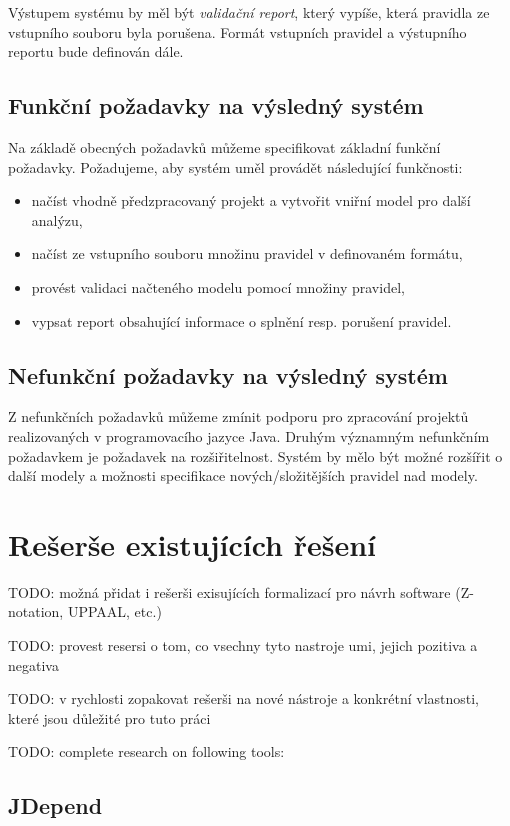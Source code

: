 Výstupem systému by měl být \emph{validační report}, který vypíše, která pravidla ze vstupního souboru byla porušena. Formát vstupních pravidel a výstupního reportu bude definován dále.

\subsection{Funkční požadavky na výsledný systém}

Na základě obecných požadavků můžeme specifikovat základní funkční požadavky. Požadujeme, aby systém uměl provádět následující funkčnosti:
\begin{itemize}
\item načíst vhodně předzpracovaný projekt a vytvořit vniřní model pro další analýzu,
\item načíst ze vstupního souboru množinu pravidel v definovaném formátu,
\item provést validaci načteného modelu pomocí množiny pravidel,
\item vypsat report obsahující informace o splnění resp. porušení pravidel.
\end{itemize}

\subsection{Nefunkční požadavky na výsledný systém}
Z nefunkčních požadavků můžeme zmínit podporu pro zpracování projektů realizovaných v programovacího jazyce Java. Druhým významným nefunkčním požadavkem je požadavek na rozšiřitelnost. Systém by mělo být možné rozšířit o další modely a možnosti specifikace nových/složitějších pravidel nad modely.

\section{Rešerše existujících řešení}
\label{requirements-existing_tools}

TODO: možná přidat i rešerši exisujících formalizací pro návrh software (Z-notation, UPPAAL, etc.)

TODO: provest resersi o tom, co vsechny tyto nastroje umi, jejich pozitiva a negativa

TODO: v rychlosti zopakovat rešerši na nové nástroje a konkrétní vlastnosti, které jsou důležité pro tuto práci

TODO: complete research on following tools:

\subsection{JDepend}

